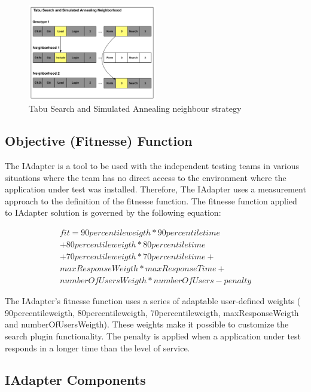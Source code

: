 \begin{figure}[h]
\includegraphics[width=0.5\textwidth]{./images/TabuNE.png}
\caption{Tabu Search and Simulated Annealing neighbour strategy}
\label{fig:neighbourtaby}
\end{figure}


\subsection{Objective (Fitnesse) Function}

The IAdapter is a tool to be used with the independent testing teams in various situations where the team has no direct access to the environment where the application under test was installed. Therefore,  The IAdapter uses a measurement approach to the definition of the fitnesse function. The fitnesse function applied to IAdapter solution is governed by the following equation:

\begin{equation}
\begin{aligned}
fit=90percentileweigth* 90percentiletime\\
+80percentileweigth*80percentiletime\\+
70percentileweigth*70percentiletime+\\
maxResponseWeigth*maxResponseTime+\\
numberOfUsersWeigth*numberOfUsers-penalty
\end{aligned}
\end{equation}

The IAdapter's fitnesse function uses a series of adaptable user-defined weights ( 90percentileweigth, 80percentileweigth,  70percentileweigth, maxResponseWeigth and numberOfUsersWeigth). These weights make it possible to customize the search plugin functionality. The penalty is applied when a application under test responds in a longer time than the level of service.

\subsection{IAdapter Components}

